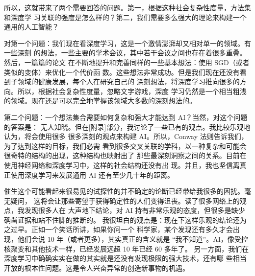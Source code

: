 所以，这就带来了两个需要回答的问题。第一，根据这种社会复杂性度量，方法集和深度学
习关联的强度是怎么样的？第二，我们需要多么强大的理论来构建一个通用的人工智能？

对第一个问题：我们现在看深度学习，这是一个激情澎湃却又相对单一的领域。有一些深刻
的想法，一些主要的学术会议，其中若干会议之间也存在着很多重叠。然后，一篇篇的论文
在不断地提升和完善同样的一些基本想法：使用 SGD（或者类似的变体）来优化一个代价函
数。这些想法非常成功。但是我们现在还没有看到子领域的健康发展，每个人在研究自己的
深刻想法，将深度学习推向很多的方向。所以，根据社会复杂性度量，忽略文字游戏，深度
学习仍然是一个相当粗浅的领域。现在还是可以完全地掌握该领域大多数的深刻想法的。

第二个问题：一个想法集合需要如何复杂和强大才能达到 AI？当然，对这个问题的答案是：
无人知晓。但在[附录]部分，我讨论了一些已有的观点。我比较乐观地认为，将会使用很多
很多深刻的观点来构建 AI。所以，Conway 法则告诉我们，为了达到这样的目标，我们必需
看到很多交叉关联的学科，以一种复杂和可能会很奇特的结构的出现，这种结构也映射出了
那些最深刻洞察之间的关系。目前在使用神经网络和深度学习中，这样的社会结构还没有出
现。并且，我也坚信离真正使用深度学习来发展通用 AI 还有至少几十年的距离。

催生这个可能看起来很易见的试探性的并不确定的论断已经带给我很多的困扰。毫无疑问，
这将会让那些寄望于获得确定性的人们变得沮丧。读了很多网络上的观点，我发现很多人在
大声地下结论，对 AI 持有非常乐观的态度，但很多是缺少确凿证据和站不住脚的推断的。
我很坦白的观点是：现在下这样乐观的结论还为之过早。正如一个笑话所讲，如果你问一个
科学家，某个发现还有多久才会出现，他们会说 10 年（或者更多），其实真正的含义就是
“我不知道”。AI，像受控核聚变和其他技术一样，已经发展远超 10 年已经 60 多年了。
另一方面，我们在深度学习中确确实实在做的其实就是还没有发现极限的强大技术，还有哪
些相当开放的根本性问题。这是令人兴奋异常的创造新事物的机遇。
